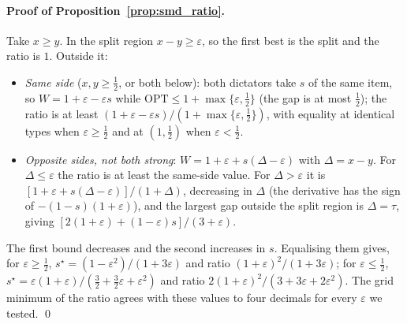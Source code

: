 \paragraph{Proof of Proposition~\ref{prop:smd_ratio}.} Take $x\ge y$. In the split region $x-y\ge\varepsilon$, so the first best
is the split and the ratio is $1$. Outside it:
\begin{itemize}[nosep]
\item \emph{Same side} ($x,y\ge\tfrac12$, or both below): both dictators take $s$ of the same item, so
  $W=1+\varepsilon-\varepsilon s$ while $\mathrm{OPT}\le1+\max\{\varepsilon,\tfrac12\}$ (the gap is at most
  $\tfrac12$); the ratio is at least $(1+\varepsilon-\varepsilon s)/(1+\max\{\varepsilon,\tfrac12\})$, with
  equality at identical types when $\varepsilon\ge\tfrac12$ and at $(1,\tfrac12)$ when $\varepsilon<\tfrac12$.
\item \emph{Opposite sides, not both strong}: $W=1+\varepsilon+s(\Delta-\varepsilon)$ with $\Delta=x-y$. For
  $\Delta\le\varepsilon$ the ratio is at least the same-side value. For $\Delta>\varepsilon$ it is
  $[1+\varepsilon+s(\Delta-\varepsilon)]/(1+\Delta)$, decreasing in $\Delta$ (the derivative has the sign of
  $-(1-s)(1+\varepsilon)$), and the largest gap outside the split region is $\Delta=\tau$, giving
  $[2(1+\varepsilon)+(1-\varepsilon)s]/(3+\varepsilon)$.
\end{itemize}
The first bound decreases and the second increases in $s$. Equalising them gives, for
$\varepsilon\ge\tfrac12$, $s^\star=(1-\varepsilon^2)/(1+3\varepsilon)$ and ratio $(1+\varepsilon)^2/(1+3\varepsilon)$; for
$\varepsilon\le\tfrac12$, $s^\star=\varepsilon(1+\varepsilon)/(\tfrac32+\tfrac32\varepsilon+\varepsilon^2)$ and ratio
$2(1+\varepsilon)^2/(3+3\varepsilon+2\varepsilon^2)$. The grid minimum of the ratio agrees with these values to
four decimals for every $\varepsilon$ we tested. \qed

